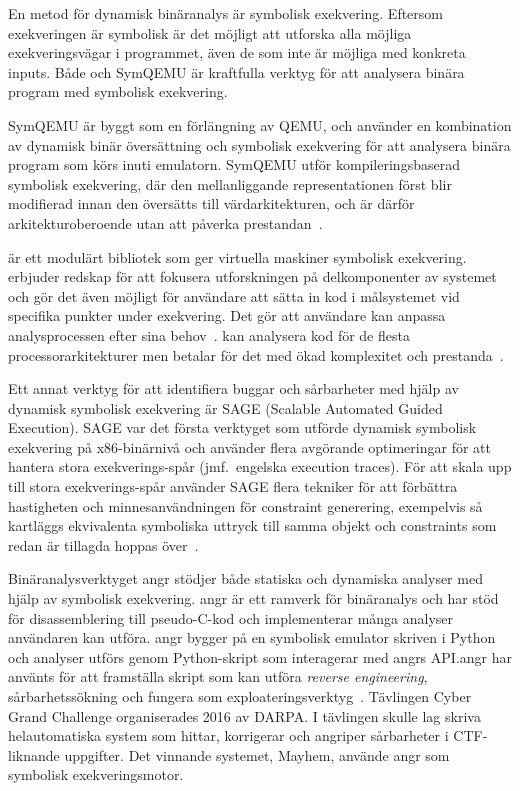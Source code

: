 En metod för dynamisk binäranalys är symbolisk exekvering. Eftersom exekveringen är symbolisk är
det möjligt att utforska alla möjliga exekveringsvägar i programmet, även de som inte är möjliga
med konkreta inputs. Både \stoe{} och SymQEMU är kraftfulla verktyg för att analysera binära program
med symbolisk exekvering.

SymQEMU är byggt som en förlängning av QEMU, och använder en kombination av dynamisk binär
översättning och symbolisk exekvering för att analysera binära program som körs inuti emulatorn.
SymQEMU utför kompileringsbaserad symbolisk exekvering, där den mellanliggande representationen först blir modifierad
innan den översätts till värdarkitekturen, och är därför arkitekturoberoende utan att påverka prestandan~\cite{symqemu}.

\stoe{} är ett modulärt bibliotek som ger virtuella maskiner symbolisk exekvering. \stoe{} erbjuder
redskap för att fokusera utforskningen på delkomponenter av systemet och gör det även
möjligt för användare att sätta in kod i målsystemet vid specifika punkter under
exekvering. Det gör att användare kan anpassa analysprocessen efter sina behov~\cite{s2e}.
\stoe{} kan analysera kod för de flesta processorarkitekturer men betalar för det med ökad
komplexitet och prestanda~\cite{symqemu}.

Ett annat verktyg för att identifiera buggar och sårbarheter med hjälp av dynamisk symbolisk
exekvering är SAGE (Scalable Automated Guided Execution).
SAGE var det första verktyget som utförde dynamisk symbolisk exekvering på x86-binärnivå och använder flera
avgörande optimeringar för att hantera stora exekverings-spår (jmf.\ engelska execution traces).
För att skala upp till stora exekverings-spår använder SAGE flera tekniker för att förbättra hastigheten och
minnesanvändningen för constraint generering, exempelvis så kartläggs ekvivalenta symboliska uttryck till samma
objekt och constraints som redan är tillagda hoppas över~\cite{sage}.

Binäranalysverktyget angr stödjer både statiska och dynamiska analyser med hjälp
av symbolisk exekvering. angr är ett ramverk för binäranalys och har stöd för
disassemblering till pseudo-C-kod och implementerar många analyser användaren
kan utföra. angr bygger på en symbolisk emulator skriven i Python och analyser
utförs genom Python-skript som interagerar med angrs API.\@ angr har använts för
att framställa skript som kan utföra \emph{reverse engineering},
sårbarhetssökning och fungera som exploateringsverktyg~\cite{angr_docs}.
Tävlingen Cyber Grand Challenge organiserades 2016 av DARPA. I tävlingen skulle
lag skriva helautomatiska system som hittar, korrigerar och angriper sårbarheter
i CTF-liknande uppgifter. Det vinnande systemet, Mayhem, använde angr som
symbolisk exekveringsmotor.

